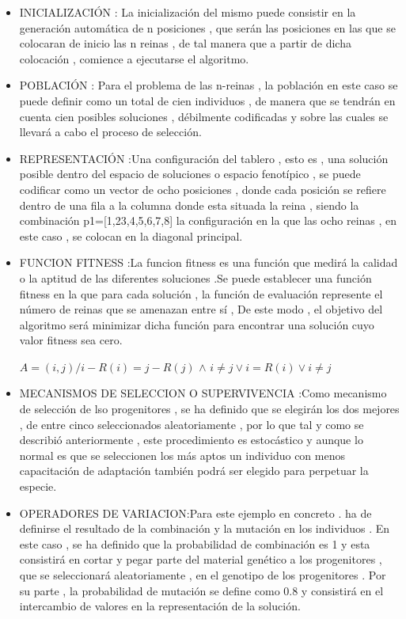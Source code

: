\documentclass{article}
\begin{document}
\begin{itemize}

    \item INICIALIZACIÓN : La inicialización del mismo puede consistir en la generación automática de n posiciones  , que serán las posiciones en las que se colocaran de inicio las n reinas , de tal manera que a partir de dicha colocación , comience a ejecutarse el algoritmo.

    \item POBLACIÓN : Para el problema de las n-reinas , la población en este caso se puede definir como un total de cien individuos , de manera que se tendrán en cuenta cien posibles soluciones , débilmente codificadas y sobre las cuales se llevará a cabo el proceso de selección. 

    \item REPRESENTACIÓN :Una configuración del tablero , esto es , una solución posible dentro del espacio de soluciones o espacio fenotípico , se puede codificar como un vector de ocho posiciones , donde cada posición se refiere dentro de una fila a la columna donde esta situada la reina , siendo la combinación p1=[1,23,4,5,6,7,8] la configuración en la que las ocho reinas , en este caso , se colocan en la diagonal principal.

    \item FUNCION FITNESS :La funcion fitness es una función que medirá la calidad o la aptitud de las diferentes soluciones .Se puede establecer una función fitness en la que para cada solución , la función de evaluación represente el número de reinas que se amenazan entre sí , De este modo , el objetivo del algoritmo será minimizar dicha función para encontrar una solución cuyo valor fitness sea cero.
    
    $A=(i,j)/i-R(i)=j-R(j)$ $\wedge$ $i \neq j \vee i = R(i) \vee i\neq j $ 
    

    \item MECANISMOS DE  SELECCION O SUPERVIVENCIA :Como mecanismo de selección de lso progenitores , se ha definido que se elegirán los dos mejores , de entre cinco seleccionados aleatoriamente , por lo que tal y como se describió anteriormente , este procedimiento es estocástico y aunque lo normal es que se seleccionen los más aptos un individuo con menos capacitación de adaptación también podrá ser elegido para perpetuar la especie. 

    \item OPERADORES DE VARIACION:Para este ejemplo en concreto . ha de definirse el resultado de la combinación y la mutación en los individuos . En este caso , se ha definido que la probabilidad de combinación es 1 y esta consistirá en cortar y pegar parte del material genético a los progenitores , que se seleccionará aleatoriamente , en el genotipo de los progenitores . Por su parte , la probabilidad de  mutación se define como 0.8 y consistirá en el intercambio de valores en la representación de la solución. 


\end{itemize}
\end{document}
